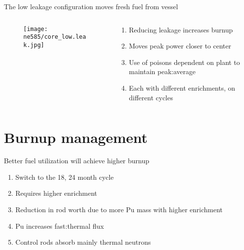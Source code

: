 \documentclass[aspectratio=1610,pdftex,dvipsnames,compress,xcolor={dvipsnames}]{beamer}
\begin{document}
\begin{frame}{The low leakage configuration moves fresh fuel from vessel}
    \begin{columns}

        \begin{column}{0.55\textwidth}
            \begin{figure}
                \centering
                \texttt{[image: ne585/core\_low.leak.jpg]}
            \end{figure}
        \end{column}

        \begin{column}{0.45\textwidth}
            \begin{enumerate}[series=outerlist,topsep=0pt,itemsep=15pt,leftmargin=*,label=(\arabic*)]
                \item[]Reducing leakage increases burnup
                \item[]Moves peak power closer to center
                \item[]Use of poisons dependent on plant to maintain peak:average
                \item[]Each with different enrichments, on different cycles
            \end{enumerate}
        \end{column}

    \end{columns}
\end{frame}


\section{Burnup management}


\addtocounter{framenumber}{-1} 
\begin{frame}{Better fuel utilization will achieve higher burnup}
    \begin{enumerate}[series=blue,topsep=0pt,itemsep=21pt,leftmargin=*,label=(\arabic*)]
        \item[]Switch to the 18, 24 month cycle
        \item[]Requires higher enrichment
        \item[]Reduction in rod worth due to more Pu mass with higher enrichment
        \item[]Pu increases fast:thermal flux
        \item[]Control rods absorb mainly thermal neutrons
    \end{enumerate}
\end{frame}
\end{document}
